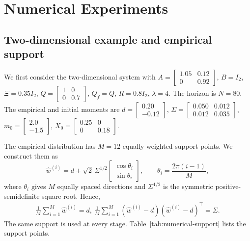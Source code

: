 \documentclass[10pt,journal,twoside]{IEEEtran}
\theoremstyle{definition}
\theoremstyle{remark}
\begin{document}
\section{Numerical Experiments}
\label{sec:numerical-experiments}



\subsection{Two-dimensional example and empirical support}

We first consider the two-dimensional system
with $A=\left[\begin{matrix}
1.05 & 0.12\\
0    & 0.92
\end{matrix}\right]$,
$B=I_2$, $\Xi=0.35I_2$, $Q=\left[\begin{matrix}
1&0\\0&0.7
\end{matrix}\right]$, $Q_f=Q$, $R=0.8I_2$, $\lambda=4$.
The horizon is \(N=80\). The empirical and initial moments are
$d=\begin{bmatrix}0.20\\-0.12\end{bmatrix}$, $\Sigma=\left[\begin{matrix}
0.050&0.012\\0.012&0.035
\end{matrix}\right]$,
$m_0=\begin{bmatrix}2.0\\-1.5\end{bmatrix}$,
$X_0=\left[\begin{matrix}0.25&0\\0&0.18\end{matrix}\right]$.

The empirical distribution has \(M=12\) equally weighted support points. We
construct them as
\begin{equation*}
\widehat w^{(i)}
=d+\sqrt{2}\,\Sigma^{1/2}
\begin{bmatrix}
\cos\theta_i\\ \sin\theta_i
\end{bmatrix},
\qquad
\theta_i=\frac{2\pi(i-1)}{M},
\end{equation*}
where \(\theta_i\) gives \(M\) equally spaced directions and
\(\Sigma^{1/2}\) is the symmetric positive-semidefinite square root. Hence,
\[
\begin{aligned}
\frac1M\sum_{i=1}^M\widehat w^{(i)}=d,~
\frac1M\sum_{i=1}^M
(\widehat w^{(i)}-d)(\widehat w^{(i)}-d)^\top=\Sigma.
\end{aligned}
\]
The same support is used at every stage. Table~\ref{tab:numerical-support}
lists the support points.
\end{document}
